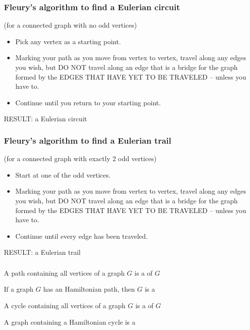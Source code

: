 \documentclass[aspectratio=43]{beamer}
\begin{document}
\begin{frame}\frametitle{Fleury's algorithm to find a Eulerian circuit}
(for a connected graph with no odd vertices)

\begin{itemize}
	\item Pick any vertex as a starting point.
	\item Marking your path as you move from vertex to vertex, travel along any edges you wish, but DO NOT travel along an edge that is a bridge for the graph formed by the EDGES THAT HAVE YET TO BE TRAVELED -- unless you have to.
	\item Continue until you return to your starting point.
\end{itemize}
RESULT: a Eulerian circuit
\end{frame}


\begin{frame}\frametitle{Fleury's algorithm to find a Eulerian trail}
(for a connected graph with exactly 2 odd vertices)

\begin{itemize}
	\item Start at one of the odd vertices.
	\item Marking your path as you move from vertex to vertex, travel along any edges you wish, but DO NOT travel along an edge that is a bridge for the graph formed by the EDGES THAT HAVE YET TO BE TRAVELED -- unless you have to.
	\item Continue until every edge has been traveled.
\end{itemize}
RESULT: a Eulerian trail
\end{frame}


\begin{frame}\frametitle{}
\begin{definition}
	A path containing all vertices of a graph $G$ is a  of $G$
\end{definition}
\vfill
\begin{definition}
	If a graph $G$ has an Hamiltonian path, then $G$ is a 
\end{definition}
\vfill
\begin{definition}
	A cycle containing all vertices of a graph $G$ is a  of $G$
\end{definition}
\vfill
\begin{definition}
	A graph containing a Hamiltonian cycle is a 
\end{definition}
\end{frame}
\end{document}
